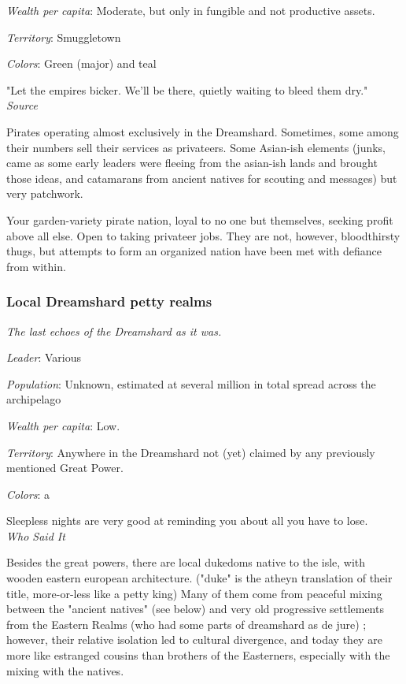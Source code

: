 \textit{Wealth per capita}: Moderate, but only in fungible and not productive assets.

\textit{Territory}: Smuggletown
    
\textit{Colors}: Green (major) and teal

\begin{rpg-quotebox}
    "Let the empires bicker. We'll be there, quietly waiting to bleed them dry." \\ \textendash \textit{Source}
\end{rpg-quotebox}


Pirates operating almost exclusively in the Dreamshard. Sometimes, some among their numbers sell their services as privateers. Some Asian-ish elements (junks, came as some early leaders were fleeing from the asian-ish lands and brought those ideas, and catamarans from ancient natives for scouting and messages) but very patchwork. 
	
Your garden-variety pirate nation, loyal to no one but themselves, seeking profit above all else. Open to taking privateer jobs. They are not, however, bloodthirsty thugs, but attempts to form an organized nation have been met with defiance from within.




\subsubsection{Local Dreamshard petty realms}


\textit{The last echoes of the Dreamshard as it was.}

\textit{Leader}: Various

\textit{Population}: Unknown, estimated at several million in total spread across the archipelago

\textit{Wealth per capita}: Low.

\textit{Territory}: Anywhere in the Dreamshard not (yet) claimed by any previously mentioned Great Power.
    
\textit{Colors}: a

\begin{rpg-quotebox}
    Sleepless nights are very good at reminding you about all you have to lose. \\ \textendash \textit{Who Said It}
\end{rpg-quotebox}

Besides the great powers, there are local dukedoms native to the isle, with wooden eastern european architecture. ("duke" is the atheyn translation of their title, more-or-less like a petty king)
Many of them come from peaceful mixing between the "ancient natives" (see below) and very old progressive settlements from the Eastern Realms (who had some parts of dreamshard as de jure) ; however, their relative isolation led to cultural divergence, and today they are more like estranged cousins than brothers of the Easterners, especially with the mixing with the natives.

